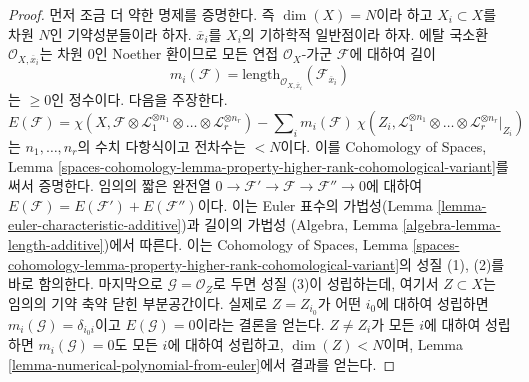 \begin{proof}
먼저 조금 더 약한 명제를 증명한다. 즉 $\dim(X) = N$이라 하고
$X_i \subset X$를 차원 $N$인 기약성분들이라 하자. $\overline{x}_i$를
$X_i$의 기하학적 일반점이라 하자. 에탈 국소환
$\mathcal{O}_{X, \overline{x}_i}$는 차원 $0$인 Noether 환이므로 모든 연접
$\mathcal{O}_X$-가군 $\mathcal{F}$에 대하여 길이
$$
m_i(\mathcal{F}) = \text{length}_{\mathcal{O}_{X, \overline{x}_i}}
(\mathcal{F}_{\overline{x}_i})
$$
는 $\geq 0$인 정수이다. 다음을 주장한다.
$$
E(\mathcal{F}) =
\chi(X, \mathcal{F} \otimes \mathcal{L}_1^{\otimes n_1} \otimes \ldots \otimes
\mathcal{L}_r^{\otimes n_r}) -
\sum\nolimits_i
m_i(\mathcal{F})\ \chi(Z_i, \mathcal{L}_1^{\otimes n_1} \otimes \ldots \otimes
\mathcal{L}_r^{\otimes n_r}|_{Z_i})
$$
는 $n_1, \ldots, n_r$의 수치 다항식이고 전차수는 $< N$이다. 이를
Cohomology of Spaces, Lemma
\ref{spaces-cohomology-lemma-property-higher-rank-cohomological-variant}를 써서
증명한다. 임의의 짧은 완전열
$0 \to \mathcal{F}' \to \mathcal{F} \to \mathcal{F}'' \to 0$에 대하여
$E(\mathcal{F}) = E(\mathcal{F}') + E(\mathcal{F}'')$이다. 이는 Euler 표수의
가법성(Lemma \ref{lemma-euler-characteristic-additive})과 길이의 가법성
(Algebra, Lemma \ref{algebra-lemma-length-additive})에서 따른다. 이는
Cohomology of Spaces, Lemma
\ref{spaces-cohomology-lemma-property-higher-rank-cohomological-variant}의 성질
(1), (2)를 바로 함의한다. 마지막으로 $\mathcal{G} = \mathcal{O}_Z$로 두면
성질 (3)이 성립하는데, 여기서 $Z \subset X$는 임의의 기약 축약 닫힌
부분공간이다.
실제로 $Z = Z_{i_0}$가 어떤 $i_0$에 대하여 성립하면
$m_i(\mathcal{G}) = \delta_{i_0i}$이고 $E(\mathcal{G}) = 0$이라는 결론을
얻는다. $Z \not = Z_i$가 모든 $i$에 대하여 성립하면
$m_i(\mathcal{G}) = 0$도 모든 $i$에 대하여 성립하고, $\dim(Z) < N$이며, Lemma
\ref{lemma-numerical-polynomial-from-euler}에서 결과를 얻는다.


\end{proof}
